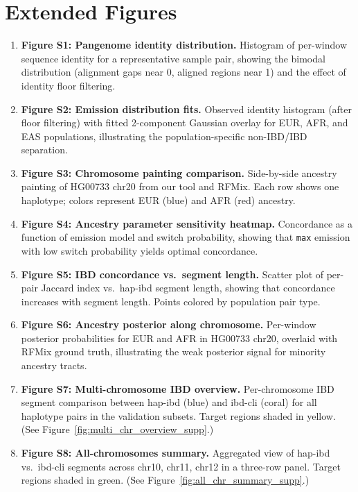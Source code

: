 \documentclass[11pt]{article}
\begin{document}
\section{Extended Figures}
\label{sec:supp_figures}

\begin{enumerate}
    \item \textbf{Figure S1: Pangenome identity distribution.} Histogram of per-window sequence identity for a representative sample pair, showing the bimodal distribution (alignment gaps near 0, aligned regions near 1) and the effect of identity floor filtering.

    \item \textbf{Figure S2: Emission distribution fits.} Observed identity histogram (after floor filtering) with fitted 2-component Gaussian overlay for EUR, AFR, and EAS populations, illustrating the population-specific non-IBD/IBD separation.

    \item \textbf{Figure S3: Chromosome painting comparison.} Side-by-side ancestry painting of HG00733 chr20 from our tool and RFMix. Each row shows one haplotype; colors represent EUR (blue) and AFR (red) ancestry.

    \item \textbf{Figure S4: Ancestry parameter sensitivity heatmap.} Concordance as a function of emission model and switch probability, showing that \texttt{max} emission with low switch probability yields optimal concordance.

    \item \textbf{Figure S5: IBD concordance vs.\ segment length.} Scatter plot of per-pair Jaccard index vs.\ hap-ibd segment length, showing that concordance increases with segment length. Points colored by population pair type.

    \item \textbf{Figure S6: Ancestry posterior along chromosome.} Per-window posterior probabilities for EUR and AFR in HG00733 chr20, overlaid with RFMix ground truth, illustrating the weak posterior signal for minority ancestry tracts.

    \item \textbf{Figure S7: Multi-chromosome IBD overview.} Per-chromosome IBD segment comparison between hap-ibd (blue) and ibd-cli (coral) for all haplotype pairs in the validation subsets. Target regions shaded in yellow. (See Figure~\ref{fig:multi_chr_overview_supp}.)

    \item \textbf{Figure S8: All-chromosomes summary.} Aggregated view of hap-ibd vs.\ ibd-cli segments across chr10, chr11, chr12 in a three-row panel. Target regions shaded in green. (See Figure~\ref{fig:all_chr_summary_supp}.)


\end{enumerate}
\end{document}
